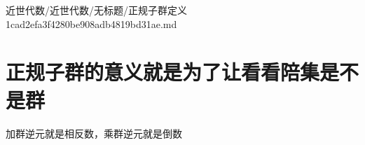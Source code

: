 \begin{note}[来源路径]

近世代数/近世代数/无标题/正规子群定义 1cad2efa3f4280be908adb4819bd31ae.md

\end{note}

\section*{正规子群的意义就是为了让看看陪集是不是群}

\begin{note}[正规子群的意义就是为了让看看陪集是不是群]

加群逆元就是相反数，乘群逆元就是倒数

\end{note}

